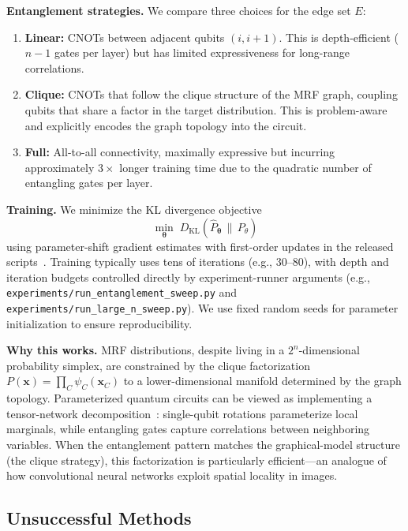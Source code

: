 \documentclass[conference,10pt]{IEEEtran}
\begin{document}
\textbf{Entanglement strategies.} We compare three choices for the edge set $E$:
\begin{enumerate}[leftmargin=*]
    \item \textbf{Linear:} CNOTs between adjacent qubits $(i,i+1)$. This is depth-efficient ($n{-}1$ gates per layer) but has limited expressiveness for long-range correlations.
    \item \textbf{Clique:} CNOTs that follow the clique structure of the MRF graph, coupling qubits that share a factor in the target distribution. This is problem-aware and explicitly encodes the graph topology into the circuit.
    \item \textbf{Full:} All-to-all connectivity, maximally expressive but incurring approximately $3\times$ longer training time due to the quadratic number of entangling gates per layer.
\end{enumerate}

\textbf{Training.} We minimize the KL divergence objective
\[
\min_{\boldsymbol{\theta}} \; D_{\mathrm{KL}}(\hat{P}_{\boldsymbol{\theta}} \,\|\, P_\theta)
\]
using parameter-shift gradient estimates with first-order updates in the released scripts~\cite{schuld2019evaluating}. Training typically uses tens of iterations (e.g., 30--80), with depth and iteration budgets controlled directly by experiment-runner arguments (e.g., \texttt{experiments/run\_entanglement\_sweep.py} and \texttt{experiments/run\_large\_n\_sweep.py}). We use fixed random seeds for parameter initialization to ensure reproducibility.

\textbf{Why this works.} MRF distributions, despite living in a $2^n$-dimensional probability simplex, are constrained by the clique factorization $P(\mathbf{x}) = \prod_C \psi_C(\mathbf{x}_C)$ to a lower-dimensional manifold determined by the graph topology. Parameterized quantum circuits can be viewed as implementing a tensor-network decomposition~\cite{huggins2019towards}: single-qubit rotations parameterize local marginals, while entangling gates capture correlations between neighboring variables. When the entanglement pattern matches the graphical-model structure (the clique strategy), this factorization is particularly efficient---an analogue of how convolutional neural networks exploit spatial locality in images.

\subsection{Unsuccessful Methods}
\end{document}
